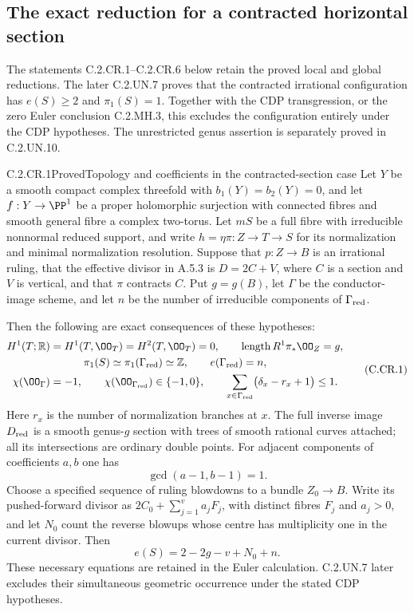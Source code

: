 \subsection{The exact reduction for a contracted horizontal section}

The statements C.2.CR.1--C.2.CR.6 below retain the
proved local and global reductions. The later
C.2.UN.7 proves that the contracted irrational
configuration has $e(S)\ge2$ and $\pi_1(S)=1$.
Together with the CDP transgression, or the zero
Euler conclusion C.2.MH.3, this excludes the
configuration entirely under the CDP hypotheses.
The unrestricted genus assertion is separately
proved in C.2.UN.10.

\begin{statement}{C.2.CR.1}{Proved}{Topology and coefficients in the contracted-section case}
Let $Y$ be a smooth compact complex threefold with
$b_1(Y)=b_2(Y)=0$, and let $f:Y\to\PP^1$ be a proper
holomorphic surjection with connected fibres and smooth
general fibre a complex two-torus. Let $mS$
be a full fibre with irreducible nonnormal reduced support, and
write $h=\eta\pi:Z\to T\to S$ for its normalization and minimal
normalization resolution. Suppose that $p:Z\to B$ is an
irrational ruling, that the effective divisor in A.5.3 is
$D=2C+V$, where $C$ is a section and $V$ is vertical, and
that $\pi$ contracts $C$. Put $g=g(B)$, let $\Gamma$ be the
conductor-image scheme, and let $n$ be the number of irreducible
components of $\Gamma_{\rm red}$.

Then the following are exact consequences of these hypotheses:
\[
\begin{gathered}
 H^1(T;\mathbb R)=H^1(T,\OO_T)=H^2(T,\OO_T)=0,
 \qquad \operatorname{length}R^1\pi_*\OO_Z=g,\\
 \pi_1(S)\simeq\pi_1(\Gamma_{\rm red})\simeq\mathbb Z,
 \qquad e(\Gamma_{\rm red})=n,\\
 \chi(\OO_\Gamma)=-1,\qquad
 \chi(\OO_{\Gamma_{\rm red}})\in\{-1,0\},\qquad
 \sum_{x\in\Gamma_{\rm red}}\bigl(\delta_x-r_x+1\bigr)\le1.
\end{gathered}
\tag{C.CR.1}
\]
Here $r_x$ is the number of normalization branches at $x$.
The full inverse image $D_{\rm red}$ is a smooth genus-$g$
section with trees of smooth rational curves attached; all
its intersections are ordinary double points. For adjacent
components of coefficients $a,b$ one has
\[
                         \gcd(a-1,b-1)=1.          \tag{C.CR.2}
\]
Choose a specified sequence of ruling blowdowns to a bundle
$Z_0\to B$. Write its pushed-forward divisor as
$2C_0+\sum_{j=1}^{v}a_jF_j$, with distinct fibres $F_j$
and $a_j>0$, and let $N_0$ count the reverse blowups whose
centre has multiplicity one in the current divisor. Then
\[
                     e(S)=2-2g-v+N_0+n.           \tag{C.CR.3}
\]
These necessary equations are retained in the Euler
calculation. C.2.UN.7 later excludes their simultaneous
geometric occurrence under the stated CDP hypotheses.
\end{statement}
